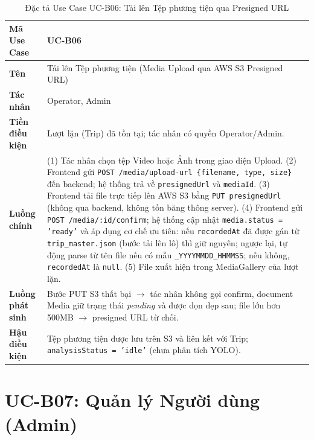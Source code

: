 \documentclass[../DoAn.tex]{subfiles}
\begin{document}
\begin{longtable}{|p{3.5cm}|p{10.0cm}|}
\caption{Đặc tả Use Case UC-B06: Tải lên Tệp phương tiện qua Presigned URL}\label{tab:ucb06}\\
\hline
\textbf{Mã Use Case} & UC-B06 \\
\hline
\textbf{Tên} & Tải lên Tệp phương tiện (Media Upload qua AWS S3 Presigned URL) \\
\hline
\textbf{Tác nhân} & Operator, Admin \\
\hline
\textbf{Tiền điều kiện} & Lượt lặn (Trip) đã tồn tại; tác nhân có quyền Operator/Admin. \\
\hline
\textbf{Luồng chính} &
(1) Tác nhân chọn tệp Video hoặc Ảnh trong giao diện Upload. \newline
(2) Frontend gửi \texttt{POST /media/upload-url\allowbreak{} \{filename, type, size\}} đến backend; hệ thống trả về \texttt{presignedUrl} và \texttt{mediaId}. \newline
(3) Frontend tải file trực tiếp lên AWS S3 bằng \texttt{PUT presignedUrl} (không qua backend, không tốn băng thông server). \newline
(4) Frontend gửi \texttt{POST /media/:id/confirm}; hệ thống cập nhật \texttt{media.status = 'ready'} và áp dụng cơ chế ưu tiên: nếu \texttt{recordedAt} đã được gán từ \texttt{trip\_master.json} (bước tải lên lô) thì giữ nguyên; ngược lại, tự động parse từ tên file nếu có mẫu \texttt{\_YYYYMMDD\_HHMMSS}; nếu không, \texttt{recordedAt} là \texttt{null}. \newline
(5) File xuất hiện trong MediaGallery của lượt lặn. \\
\hline
\textbf{Luồng phát sinh} & Bước PUT S3 thất bại $\to$ tác nhân không gọi confirm, document Media giữ trạng thái \textit{pending} và được dọn dẹp sau; file lớn hơn 500MB $\to$ presigned URL từ chối. \\
\hline
\textbf{Hậu điều kiện} & Tệp phương tiện được lưu trên S3 và liên kết với Trip; \texttt{analysisStatus = 'idle'} (chưa phân tích YOLO). \\
\hline
\end{longtable}

\section{UC-B07: Quản lý Người dùng (Admin)}
\end{document}
